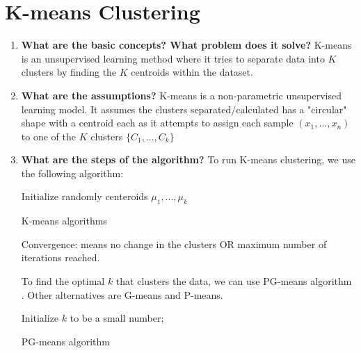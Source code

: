 \documentclass{article}
\begin{document}
\bigbreak\bigbreak\bigbreak\bigbreak\bigbreak\bigbreak\bigbreak\bigbreak\bigbreak\bigbreak


\section{K-means Clustering}
\noindent
\begin{enumerate}
    \item \textbf{What are the basic concepts? What problem does it solve?}
    \noindent 
    \smallbreak
    K-means is an unsupervised learning method where it tries to separate data into $K$ clusters by finding the $K$ centroids within the dataset.
    
    \item \textbf{What are the assumptions?}
    \noindent 
    \smallbreak
    K-means is a non-parametric unsupervised learning model. It assumes the clusters separated/calculated has a "circular" shape with a centroid each  as it attempts to assign each sample $(x_1, ..., x_n)$ to one of the $K$ clusters $\{C_1, ..., C_k\}$
    
    \item \textbf{What are the steps of the algorithm?}
    \noindent 
    \smallbreak
    To run K-means clustering, we use the following algorithm:
    
    \begin{algorithm}
        Initialize randomly centeroids $\mu_1, ..., \mu_k$\;
        \caption{K-means algorithms}
        Convergence: means no change in the clusters OR maximum number of iterations reached.
    \end{algorithm}
    
    To find the optimal $k$ that clusters the data, we can use PG-means algorithm \cite{5}. Other alternatives are G-means and P-means.
    \begin{algorithm}
        Initialize $k$ to be a small number;
        \caption{PG-means algorithm}
    \end{algorithm}
    

\end{enumerate}
\end{document}
